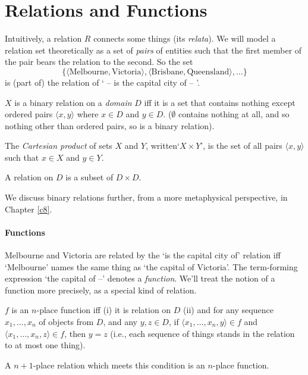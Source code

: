 \section{Relations and Functions}
Intuitively, a relation $R$ connects some things (its \emph{relata}). We will model a relation set theoretically as a set of \emph{pairs} of entities such that the first member of the pair bears the relation to the second.  So the set $$\{\langle \text{Melbourne},\text{Victoria}\rangle, \langle \text{Brisbane},\text{Queensland}\rangle,\ldots\}$$ is (part of) the relation of ` –  is the capital city of  – '.
\begin{definition}
	$X$ is a binary relation on a \emph{domain} $D$ iff it is a set that contains nothing except ordered pairs $\langle x,y\rangle$ where $x \in D$ and $y\in D$. ($\emptyset$ contains nothing at all, and so nothing other than ordered pairs, so is a binary relation).
\end{definition}
\begin{definition}
	The \emph{Cartesian product} of sets $X$ and 
	$Y$, written‘$X \times Y$’, is the set of all pairs $\langle x,y\rangle$
	such that $x \in X$ and $y \in Y$.
\end{definition} A relation on $D$ is a subset of $D \times D$.

We discuss binary relations further, from a more metaphysical perspective, in Chapter \ref{c8}.

\paragraph{Functions}

Melbourne and Victoria are related by the `is the capital city of' relation iff `Melbourne' names the same thing as `the capital of Victoria'. The term-forming expression `the capital of  –' denotes a \emph{function}. We'll treat the notion of a function more precisely, as a special kind of relation.
\begin{definition}[Function]
	$f$ is an $n$-place function iff (i) it is relation on $D$ (ii) and for any sequence $x_{1},\ldots,x_{n}$ of objects from $D$, and any $y,z \in D$, if $\langle x_{1},\ldots,x_{n},y\rangle \in f$ and $\langle x_{1},\ldots,x_{n},z\rangle \in f$, then $y=z$ (i.e., each sequence of things stands in the relation to at most one thing). 
\end{definition}
 A $n+1$-place relation which meets this condition is an $n$-place function.

